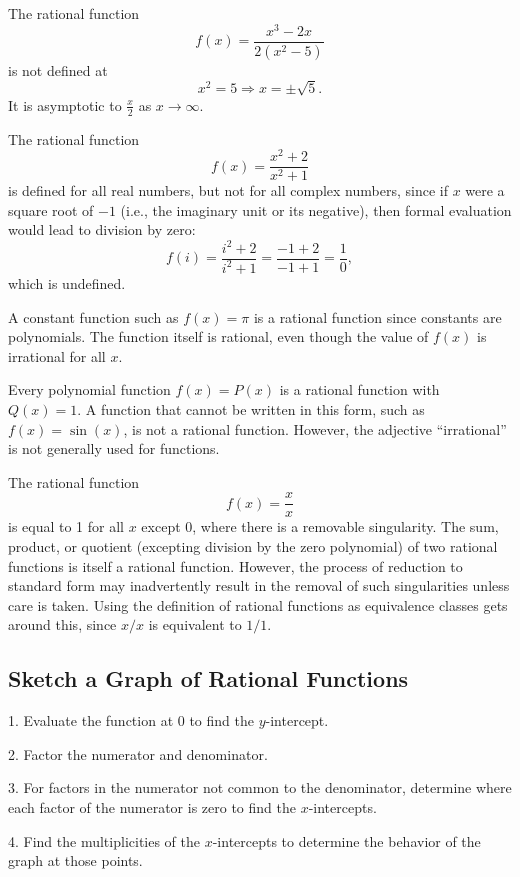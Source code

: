 The rational function
\[
f(x) = \frac{x^3 - 2x}{2(x^2 - 5)}
\]
is not defined at
\[
x^2 = 5 \Rightarrow x = \pm \sqrt{5}.
\]
It is asymptotic to $\frac{x}{2}$ as $x \to \infty$.

The rational function
\[
f(x) = \frac{x^2 + 2}{x^2 + 1}
\]
is defined for all real numbers, but not for all complex numbers, since if $x$ were a square root of $-1$ (i.e., the imaginary unit or its negative), then formal evaluation would lead to division by zero:
\[
f(i) = \frac{i^2 + 2}{i^2 + 1} = \frac{-1 + 2}{-1 + 1} = \frac{1}{0},
\]
which is undefined.

A constant function such as $f(x) = \pi$ is a rational function since constants are polynomials. The function itself is rational, even though the value of $f(x)$ is irrational for all $x$.

Every polynomial function $f(x) = P(x)$ is a rational function with $Q(x) = 1$. A function that cannot be written in this form, such as $f(x) = \sin(x)$, is not a rational function. However, the adjective ``irrational'' is not generally used for functions.

The rational function
\[
f(x) = \frac{x}{x}
\]
is equal to 1 for all $x$ except 0, where there is a removable singularity. The sum, product, or quotient (excepting division by the zero polynomial) of two rational functions is itself a rational function. However, the process of reduction to standard form may inadvertently result in the removal of such singularities unless care is taken. Using the definition of rational functions as equivalence classes gets around this, since $x/x$ is equivalent to $1/1$.

\subsection{Sketch a Graph of Rational Functions}
\label{sss:sket-9dfc}

1. Evaluate the function at $0$ to find the $y$-intercept.

2. Factor the numerator and denominator.

3. For factors in the numerator not common to the denominator, determine where each factor of the numerator is zero to find the $x$-intercepts.

4. Find the multiplicities of the $x$-intercepts to determine the behavior of the graph at those points.

